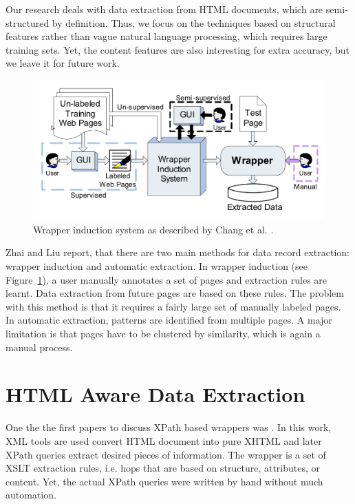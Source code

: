 Our research deals with data extraction from HTML documents, which are semi-structured by definition. Thus, we focus on the techniques based on structural features rather than vague natural language processing, which requires large training sets. Yet, the content features are also interesting for extra accuracy, but we leave it for future work.

\begin{figure}[h]
	\centering
	\includegraphics[width=1.0\textwidth]{figures/wrapper-induction}
	\caption{Wrapper induction system as described by Chang et al. \cite{Chang:2006:SWI:1159162.1159300}.}
	\label{fig:wrapper-induction}
\end{figure}

Zhai and Liu \cite{zhai2005a} report, that there are two main methods for data record extraction: wrapper induction and automatic extraction. In wrapper induction (see Figure~\ref{fig:wrapper-induction}), a user manually annotates a set of pages and extraction rules are learnt. Data extraction from future pages are based on these rules. The problem with this method is that it requires a fairly large set of manually labeled pages. In automatic extraction, patterns are identified from multiple pages. A major limitation is that pages have to be clustered by similarity, which is again a manual process.


\section{HTML Aware Data Extraction}

One the the first papers to discuss XPath based wrappers was \cite{Myllymaki02robustweb}. In this work, XML tools are used convert HTML document into pure XHTML and later XPath queries extract desired pieces of information. The wrapper is a set of XSLT extraction rules, i.e. hops that are based on structure, attributes, or content. Yet, the actual XPath queries were written by hand without much automation.

